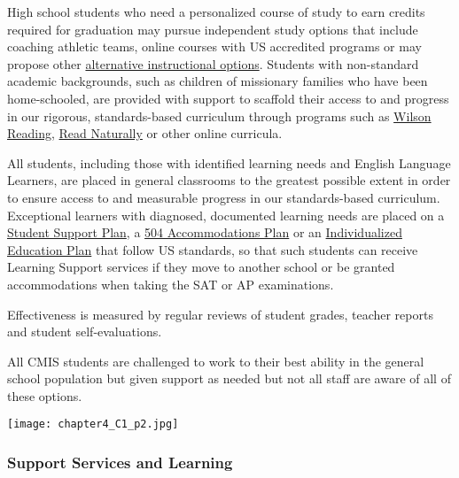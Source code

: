 \begin{findings}
High school students who need a personalized course of study to earn credits required for graduation may pursue independent study options that include coaching athletic teams, online courses with US accredited programs or may propose other \href{http://www.ck12.org/}{alternative instructional options}. Students with non-standard academic backgrounds, such as children of missionary families who have been home-schooled, are provided with support to scaffold their access to and progress in our rigorous, standards-based curriculum through programs such as \href{http://www.wilsonlanguage.com/programs/wilson-reading-system/}{Wilson Reading}, \href{https://www.readnaturally.com/}{Read Naturally} or other online curricula.

All students, including those with identified learning needs and English Language Learners, are placed in general classrooms to the greatest possible extent in order to ensure access to and measurable progress in our standards-based curriculum. Exceptional learners with diagnosed, documented learning needs are placed on a \href{https://drive.google.com/drive/u/0/folders/0B_rFN7xA3AUNdlVaY2E1WGo1bUE}{Student Support Plan}, a \href{https://drive.google.com/drive/u/0/folders/0B_rFN7xA3AUNdlVaY2E1WGo1bUE}{504 Accommodations Plan} or an \href{https://drive.google.com/drive/u/0/folders/0B_rFN7xA3AUNdlVaY2E1WGo1bUE}{Individualized Education Plan} that follow US standards, so that such students can receive Learning Support services if they move to another school or be granted accommodations when taking the SAT or AP examinations. 

Effectiveness is measured by regular reviews of student grades, teacher reports and student self-evaluations.


All CMIS students are challenged to work to their best ability in the general school population but given support as needed but not all staff are aware of all of these options.
\end{findings}

{\centering\texttt{[image: chapter4\_C1\_p2.jpg]}}

\subsubsection{Support Services and Learning}


